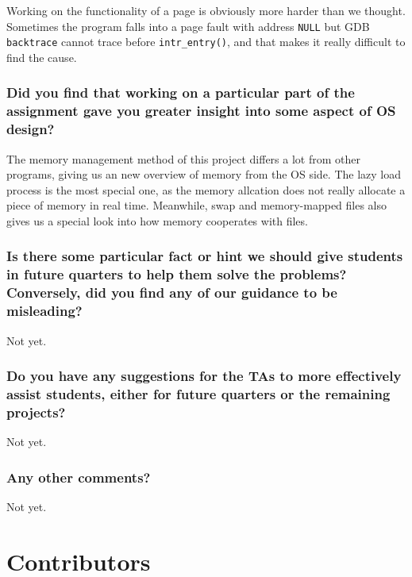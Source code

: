 \documentclass[sigconf, nonacm, balance=false, urlbreakonhyphens=true]{acmart}
\begin{document}
            Working on the functionality of a page is obviously more harder than we thought. Sometimes the program falls into a page fault with address \texttt{NULL} but GDB \texttt{backtrace} cannot trace before \texttt{intr\_entry()}, and that makes it really difficult to find the cause. 

        \subsubsection*{Did you find that working on a particular part of the assignment gave you greater insight into some aspect of OS design? }

            The memory management method of this project differs a lot from other programs, giving us an new overview of memory from the OS side. The lazy load process is the most special one, as the memory allcation does not really allocate a piece of memory in real time. Meanwhile, swap and memory-mapped files also gives us a special look into how memory cooperates with files. 

        \subsubsection*{Is there some particular fact or hint we should give students in future quarters to help them solve the problems? Conversely, did you find any of our guidance to be misleading? }

            Not yet. 

        \subsubsection*{Do you have any suggestions for the TAs to more effectively assist students, either for future quarters or the remaining projects? }

            Not yet. 

        \subsubsection*{Any other comments? }

            Not yet. 
    
    \section*{Contributors}
\end{document}
